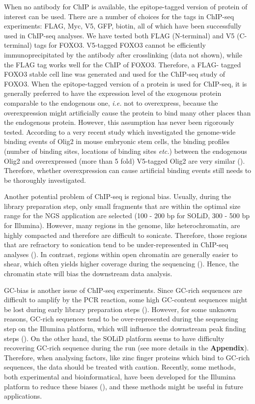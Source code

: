 When no antibody for ChIP is available, the epitope-tagged version of protein of interest can be used. There are a number of choices for the tags in ChIP-seq experiments: FLAG, Myc, V5, GFP, biotin, all of which have been successfully used in ChIP-seq analyses. We have tested both FLAG (N-terminal) and V5 (C-terminal) tags for FOXO3. V5-tagged FOXO3 cannot be efficiently immunoprecipitated by the antibody after crosslinking (data not shown), while the FLAG tag works well for the ChIP of FOXO3. Therefore, a FLAG- tagged FOXO3 stable cell line was generated and used for the ChIP-seq study of FOXO3. When the epitope-tagged version of a protein is used for ChIP-seq, it is generally preferred to have the expression level of the exogenous protein comparable to the endogenous one, \textit{i.e.} not to overexpress, because the overexpression might artificially cause the protein to bind many other places than the endogenous protein. However, this assumption has never been rigorously tested. According to a very recent study which investigated the genome-wide binding events of Olig2 in mouse embryonic stem cells, the binding profiles (number of binding sites, locations of binding sites \textit{etc.}) between the endogenous Olig2 and overexpressed (more than 5 fold) V5-tagged Olig2 are very similar (\cite{mazzoni2011embryonic}). Therefore, whether overexpression can cause artificial binding events still needs to be thoroughly investigated.

Another potential problem of ChIP-seq is regional bias. Usually, during the library preparation step, only small fragments that are within the optimal size range for the NGS application are selected (100 - 200 bp for SOLiD, 300 - 500 bp for Illumina). However, many regions in the genome, like heterochromatin, are highly compacted and therefore are difficult to sonicate. Therefore, those regions that are refractory to sonication tend to be under-represented in ChIP-seq analyses (\cite{teytelman2009impact}). In contrast, regions within open chromatin are generally easier to shear, which often yields higher coverage during the sequencing (\cite{auerbach2009mapping}). Hence, the chromatin state will bias the downstream data analysis.

GC-bias is another issue of ChIP-seq experiments. Since GC-rich sequences are difficult to amplify by the PCR reaction, some high GC-content sequences might be lost during early library preparation steps (\cite{aird2011analyzing}). However, for some unknown reasons, GC-rich sequences tend to be over-represented during the sequencing step on the Illumina platform, which will influence the downstream peak finding steps (\cite{dohm2008substantial,cheung2011systematic}). On the other hand, the SOLiD platform seems to have difficulty recovering GC-rich sequence during the run (see more details in the \textbf{Appendix}). Therefore, when analysing factors, like zinc finger proteins which bind to GC-rich sequences, the data should be treated with caution. Recently, some methods, both experimental and bioinformatical, have been developed for the Illumina platform to reduce these biases (\cite{aird2011analyzing,cheung2011systematic}), and these methods might be useful in future applications.

